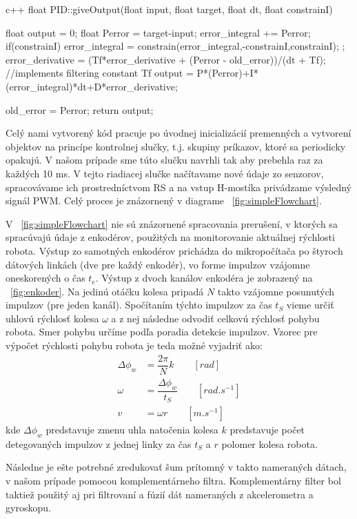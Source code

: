 \begin{inlinecode}[label={lst:PIDsample},caption={Príklad jednej z metód triedy PID}]{c++}
float PID::giveOutput(float input, float target, float dt, float constrainI){
    float output  = 0;
    float Perror = target-input;
    error_integral += Perror;
    if(constrainI){
        error_integral = constrain(error_integral,-constrainI,constrainI);
    };
    error_derivative = (Tf*error_derivative + (Perror - old_error))/(dt + Tf);       //implements filtering constant Tf
    output = P*(Perror)+I*(error_integral)*dt+D*error_derivative;

    old_error = Perror;
    return output;
}
\end{inlinecode}

Celý nami vytvorený kód pracuje po úvodnej inicializácií premenných a vytvorení objektov na princípe kontrolnej slučky, t.j. skupiny príkazov, ktoré sa periodicky opakujú. V našom prípade sme túto slučku navrhli tak aby prebehla raz za každých 10 ms. V tejto riadiacej slučke načítavame nové údaje zo senzorov, spracovávame ich prostredníctvom \ac{RS} a na vstup H-mostíka privádzame výsledný signál \ac{PWM}. Celý proces je znázornený v diagrame \figurename~\ref{fig:simpleFlowchart}.

V \figurename~\ref{fig:simpleFlowchart} nie sú znázornené spracovania prerušení, v ktorých sa spracúvajú údaje z enkodérov, použitých na monitorovanie aktuálnej rýchlosti robota. Výstup zo samotných enkodérov prichádza do mikropočítača po štyroch dátových linkách (dve pre každý enkodér), vo forme impulzov vzájomne oneskorených o čas $t_e$. Výstup z dvoch kanálov enkodéra je zobrazený na \figurename~\ref{fig:enkoder}. Na jedinú otáčku kolesa pripadá $N$ takto vzájomne posunutých impulzov (pre jeden kanál). Spočítaním týchto impulzov za čas  $t_S$ vieme určiť uhlovú rýchlosť kolesa $\omega$ a z nej následne odvodiť celkovú rýchlosť pohybu robota. Smer pohybu určíme podľa poradia detekcie impulzov. Vzorec pre výpočet rýchlosti pohybu robota je teda možné vyjadriť ako:
\begin{align*}
\Delta\phi_w &= \dfrac{2\pi}{N}k \qquad [rad] \\
\omega &= \dfrac{\Delta\phi_w}{t_S} \qquad [rad.s^{-1}]\\
v &= \omega r \qquad[m.s^{-1}]
\end{align*}
kde $\Delta\phi_w$ predstavuje zmenu uhla natočenia kolesa $k$ predstavuje počet detegovaných impulzov z jednej linky za čas $t_S$ a $r$ polomer kolesa robota.

Následne je ešte potrebné zredukovať šum prítomný v takto nameraných dátach, v našom prípade pomocou komplementárneho filtra. Komplementárny filter bol taktiež použitý aj pri filtrovaní a fúzií dát nameraných z akcelerometra a gyroskopu.  

